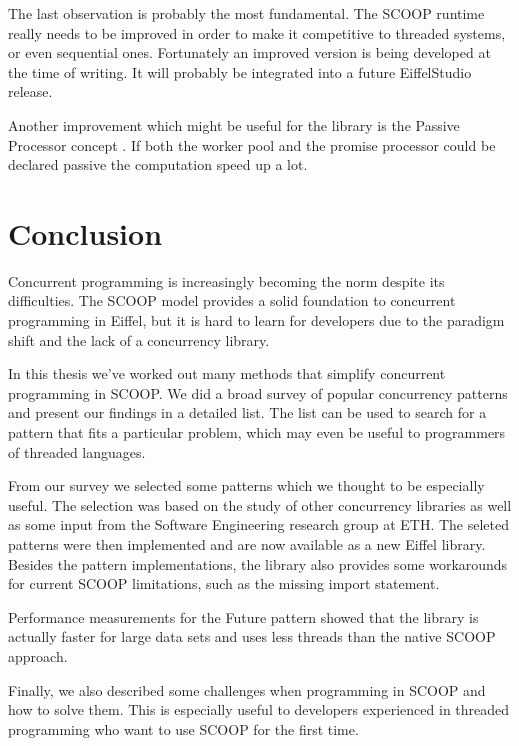 \documentclass[a4paper,10pt,titlepage]{article}
\begin{document}
The last observation is probably the most fundamental.
The SCOOP runtime really needs to be improved in order to make it competitive to threaded systems, or even sequential ones.
Fortunately an improved version \cite{thesis:scottwest} is being developed at the time of writing.
It will probably be integrated into a future EiffelStudio release.

Another improvement which might be useful for the library is the Passive Processor concept \cite{paper:passive-processors}.
If both the worker pool and the promise processor could be declared passive the computation speed up a lot.

\section{Conclusion}

Concurrent programming is increasingly becoming the norm despite its difficulties.
The SCOOP model provides a solid foundation to concurrent programming in Eiffel, 
but it is hard to learn for developers due to the paradigm shift and the lack of a concurrency library.

In this thesis we've worked out many methods that simplify concurrent programming in SCOOP.
We did a broad survey of popular concurrency patterns and present our findings in a detailed list.
The list can be used to search for a pattern that fits a particular problem, which may even be useful to programmers of threaded languages.

From our survey we selected some patterns which we thought to be especially useful.
The selection was based on the study of other concurrency libraries as well as some input from the Software Engineering research group at ETH.
The seleted patterns were then implemented and are now available as a new Eiffel library.
Besides the pattern implementations, the library also provides some workarounds for current SCOOP limitations, such as the missing import statement.

Performance measurements for the Future pattern showed that the library is actually faster for large data sets and uses less threads than the native SCOOP approach.

Finally, we also described some challenges when programming in SCOOP and how to solve them.
This is especially useful to developers experienced in threaded programming who want to use SCOOP for the first time.
\end{document}
